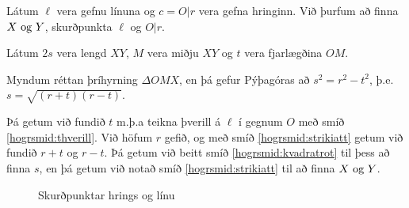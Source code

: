 \begin{frame}
  \begin{hogrsmid}\label{hogrsmid:skplinuoghrings}
    Látum \(\ell\) vera gefnu línuna og \(c = O|r\) vera gefna hringinn.
    Við þurfum að finna \(X \text{ og } Y\), skurðpunkta \(\ell\) og \(O|r\).

    Látum \(2s\) vera lengd \(XY\), \(M\) vera miðju \(XY\) og
    \(t\) vera fjarlægðina \(OM\).

    Myndum réttan þríhyrning \(\Delta OMX\),
    en þá gefur Pýþagóras að \(s^2 = r^2 - t^2\), þ.e.
    \(s = \sqrt{(r+t)(r-t)}\).

    Þá getum við fundið \(t\) m.þ.a teikna þverill á \(\ell\) í gegnum
    \(O\) með smíð \ref{hogrsmid:thverill}. Við höfum \(r\) gefið, og
    með smíð \ref{hogrsmid:strikiatt} getum við fundið \(r+t\) og \(r-t\).
    Þá getum við beitt smíð \ref{hogrsmid:kvadratrot} til þess að finna
    \(s\), en þá getum við notað smíð \ref{hogrsmid:strikiatt} til að finna
    \(X \text{ og } Y\).
  \end{hogrsmid}
\end{frame}

\begin{frame}
  \begin{figure}[H]
    \centering

    \caption{Skurðpunktar hrings og línu}
    \label{fig:hogrskphringsoglinu}
  \end{figure}
\end{frame}

